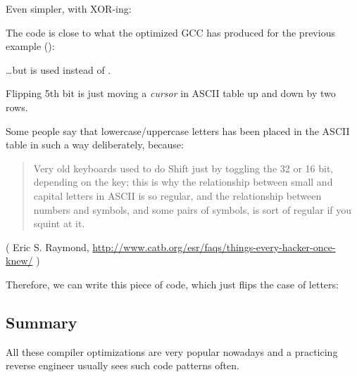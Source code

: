 Even simpler, with XOR-ing:



The code is close to what the optimized GCC has produced for the previous example ():



\dots but  is used instead of .

Flipping 5th bit is just moving a \textit{cursor} in \ac{ASCII} table up and down by two rows.

Some people say that lowercase/uppercase letters has been placed in the \ac{ASCII} table in such a way deliberately,
because:

\begin{framed}
\begin{quotation}
Very old keyboards used to do Shift just by toggling the 32 or 16 bit, depending on the key; this is why the relationship between small and capital letters in ASCII is so regular, and the relationship between numbers and symbols, and some pairs of symbols, is sort of regular if you squint at it.
\end{quotation}
\end{framed}

( Eric S. Raymond, \url{http://www.catb.org/esr/faqs/things-every-hacker-once-knew/} )

Therefore, we can write this piece of code, which just flips the case of letters:



\subsection{Summary}

All these compiler optimizations are very popular nowadays 
and a practicing reverse engineer usually sees such code patterns often.

